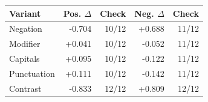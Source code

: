 \begin{tabular}{lrrrr}
\toprule
Variant & Pos. $\Delta$ & Check & Neg. $\Delta$ & Check\\
\midrule
Negation & -0.704 & 10/12 & +0.688 & 11/12 \\
Modifier & +0.041 & 10/12 & -0.052 & 11/12 \\
Capitals & +0.095 & 10/12 & -0.122 & 11/12 \\
Punctuation & +0.111 & 10/12 & -0.142 & 11/12 \\
Contrast & -0.833 & 12/12 & +0.809 & 12/12 \\
\bottomrule
\end{tabular}
